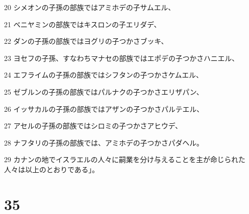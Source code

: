 \par 20 シメオンの子孫の部族ではアミホデの子サムエル、
\par 21 ベニヤミンの部族ではキスロンの子エリダデ、
\par 22 ダンの子孫の部族ではヨグリの子つかさブッキ、
\par 23 ヨセフの子孫、すなわちマナセの部族ではエポデの子つかさハニエル、
\par 24 エフライムの子孫の部族ではシフタンの子つかさケムエル、
\par 25 ゼブルンの子孫の部族ではパルナクの子つかさエリザパン、
\par 26 イッサカルの子孫の部族ではアザンの子つかさパルテエル、
\par 27 アセルの子孫の部族ではシロミの子つかさアヒウデ、
\par 28 ナフタリの子孫の部族では、アミホデの子つかさパダヘル。
\par 29 カナンの地でイスラエルの人々に嗣業を分け与えることを主が命じられた人々は以上のとおりである」。

\chapter{35}

